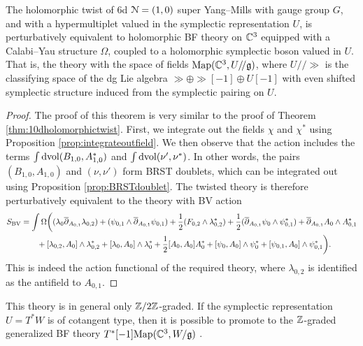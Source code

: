 \documentclass[10pt, oneside]{article}
\begin{document}
\begin{thm}
The holomorphic twist of 6d $\mathcal{N}=(1, 0)$ super Yang--Mills with gauge group $G$, and with a hypermultiplet valued in the symplectic representation $U$, is perturbatively equivalent to holomorphic BF theory on $\mathbb C^3$ equipped with a Calabi--Yau structure $\Omega$, coupled to a holomorphic symplectic boson valued in $U$.  That is, the theory with the space of fields $\mathrm{Map}(\mathbb C^3, U/\!/\mathfrak{g})$, where $U/\!/\gg$ is the classifying space of the dg Lie algebra $\gg \oplus \gg[-1] \oplus U[-1]$ with even shifted symplectic structure induced from the symplectic pairing on $U$. 
\label{thm:6dholomorphictwist}
\end{thm}

\begin{proof}
The proof of this theorem is very similar to the proof of Theorem \ref{thm:10dholomorphictwist}.  First, we integrate out the fields $\chi$ and $\chi^*$ using Proposition \ref{prop:integrateoutfield}.  We then observe that the action includes the terms $\int \operatorname{dvol}  (B_{1,0}, A_{1,0}^*)$ and  $\int \operatorname{dvol} (\nu', \nu^*)$.  In other words, the pairs $(B_{1,0}, A_{1,0})$ and $(\nu, \nu')$ form BRST doublets, which can be integrated out using Proposition \ref{prop:BRSTdoublet}.  The twisted theory is therefore perturbatively equivalent to the theory with BV action 
\begin{align*}
 S_{\mathrm{BV}} &= \int \Omega \bigg( (\lambda_0 \overline{\partial}_{A_{0,1}} \lambda_{0,2})  + (\psi_{0,1} \wedge \overline{\partial}_{A_{0,1}} \psi_{0,1}) + \frac 12 (F_{0,2} \wedge \lambda_{0,2}^*) + \frac 12( \overline{\partial}_{A_{0,1}} \psi_0 \wedge \psi_{0,1}^*) +  \overline{\partial}_{A_{0, 1}} A_0\wedge A_{0, 1}^* \\ 
  &\qquad  + [\lambda_{0,2}, A_0]\wedge \lambda_{0,2}^* + [\lambda_{0}, A_0]\wedge \lambda_{0}^* + \frac{1}{2}[A_0, A_0]A_0^* +  [\psi_{0}, A_0]\wedge \psi_{0}^* + [\psi_{0,1}, A_0]\wedge \psi_{0,1}^*  \bigg).
\end{align*}
This is indeed the action functional of the required theory, where $\lambda_{0,2}$ is identified as the antifield to $A_{0,1}$.
\end{proof}

\begin{remark} \label{6d_BF_remark}
This theory is in general only $\mathbb Z/2\mathbb Z$-graded.  If the symplectic representation $U = T^*W$ is of cotangent type, then it is possible to promote to the $\mathbb Z$-graded generalized BF theory $T^*[-1]\mathrm{Map}(\mathbb C^3, W/\mathfrak{g})$ .
\end{remark}
\end{document}
